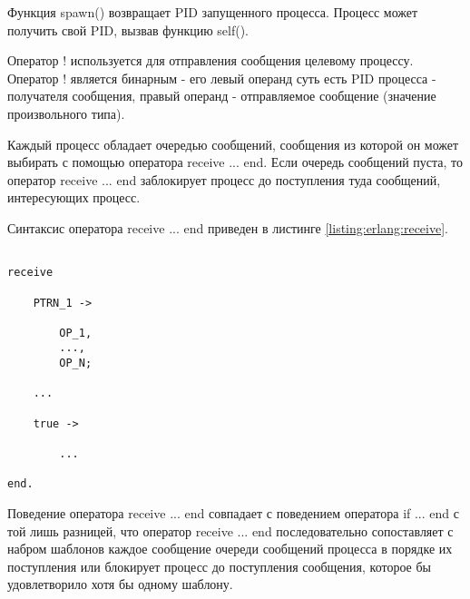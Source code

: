 Функция spawn() возвращает PID запущенного процесса. Процесс может получить свой PID, вызвав функцию self().

Оператор ! используется для отправления сообщения целевому процессу. Оператор ! является бинарным - его левый операнд суть есть PID процесса - получателя сообщения, правый операнд - отправляемое сообщение (значение произвольного типа).

Каждый процесс обладает очередью сообщений, сообщения из которой он может выбирать с помощью оператора receive ... end. Если очередь сообщений пуста, то оператор receive ... end заблокирует процесс до поступления туда сообщений, интересующих процесс.

Синтаксис оператора receive ... end приведен в листинге \ref{listing:erlang:receive}.

\begin{lstlisting}

receive

	PTRN_1 ->

		OP_1,
		...,
		OP_N;

	...

	true ->

		...

end.

\end{lstlisting}
\mylistingend

Поведение оператора receive ... end совпадает с поведением оператора if ... end с той лишь разницей, что оператор receive ... end последовательно сопоставляет с набром шаблонов каждое сообщение очереди сообщений процесса в порядке их поступления или блокирует процесс до поступления сообщения, которое бы удовлетворило хотя бы одному шаблону.

